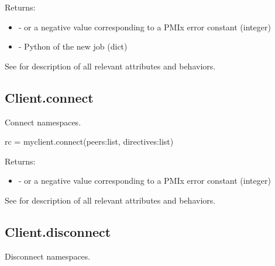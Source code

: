 Returns:

\begin{itemize}
    \item {} -  or a negative value corresponding to a PMIx error constant (integer)
    \item {} - Python  of the new job (dict)
\end{itemize}

See  for description of all relevant attributes and behaviors.


\subsection{Client.connect}

\summary

Connect namespaces.

\format

\pyspecificstart
\begin{codepar}
rc = myclient.connect(peers:list, directives:list)
\end{codepar}
\pyspecificend

\begin{arglist}
\end{arglist}

Returns:

\begin{itemize}
    \item {} -  or a negative value corresponding to a PMIx error constant (integer)
\end{itemize}

See  for description of all relevant attributes and behaviors.


\subsection{Client.disconnect}

\summary

Disconnect namespaces.

\format


